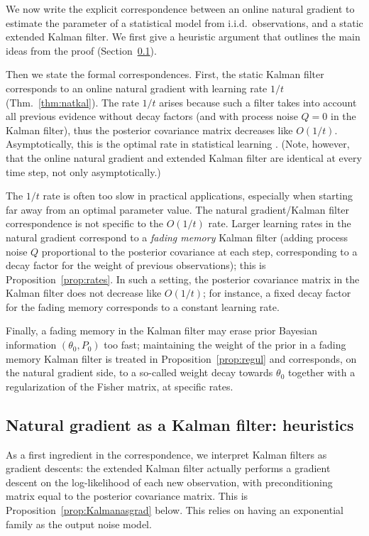 \documentclass[11pt,a4paper]{article}
\newcommand{\1}{\mathbbm{1}}
\theoremstyle{yannthm}
\theoremstyle{yannthm2}
\numberwithin{equation}{section}
\begin{document}
We now write the explicit correspondence between an online natural
gradient to estimate the parameter of a statistical model from i.i.d.\
observations, and a static extended Kalman filter. We first give a
heuristic argument that outlines the main ideas from the proof
(Section~\ref{sec:heuristics}).

Then we state the formal correspondences. First, the static Kalman filter
corresponds to an online natural gradient with learning rate $1/t$
(Thm.~\ref{thm:natkal}). The rate $1/t$ arises because such a filter
takes into account all previous evidence without decay factors (and with
process noise $Q=0$ in the Kalman filter), thus the posterior covariance
matrix decreases like $O(1/t)$. Asymptotically, this is the
optimal rate in statistical learning \cite{Amari1998}.
(Note, however, that the online natural gradient and extended Kalman
filter are identical at every time step, not only asymptotically.)

The $1/t$ rate is often too slow in practical applications,
especially when starting far away from an optimal parameter value. The
natural gradient/Kalman filter correspondence is not specific to the
$O(1/t)$ rate. Larger learning rates in the natural gradient correspond
to a \emph{fading memory} Kalman filter (adding process noise $Q$
proportional to the posterior covariance at each step, corresponding to a
decay factor for the weight of previous observations); this is
Proposition~\ref{prop:rates}. In such a setting, the posterior covariance
matrix in the Kalman filter does not decrease like $O(1/t)$; for
instance, a fixed decay factor for the fading memory corresponds to a
constant learning rate.

Finally, a fading memory in the Kalman filter may erase prior Bayesian
information $(\theta_0,P_0)$ too fast; maintaining the weight of the
prior in a fading memory Kalman filter is treated in
Proposition~\ref{prop:regul} and corresponds, on the natural gradient
side, to a so-called weight decay \cite{Bishop_book} towards $\theta_0$ together with a regularization
of the Fisher matrix, at specific rates.

\subsection{Natural gradient as a Kalman filter: heuristics}
\label{sec:heuristics}

As a first ingredient in the correspondence, we interpret Kalman filters as gradient descents:
the extended Kalman filter actually performs a gradient descent on the
log-likelihood of each new observation, with preconditioning matrix equal to
the posterior covariance matrix. This is Proposition~\ref{prop:Kalmanasgrad}
below. This relies on having an exponential family as the output noise
model.
\end{document}

